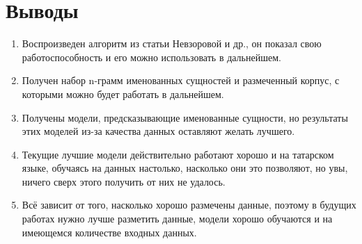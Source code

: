 





\newpage

\section{Выводы}

\begin{enumerate}
\item Воспроизведен алгоритм из статьи Невзоровой и др., он показал свою работоспособность и его можно использовать в дальнейшем. %
\item Получен набор n-грамм именованных сущностей и размеченный корпус, с которыми можно будет работать в дальнейшем.
\item Получены модели, предсказывающие именованные сущности, но результаты этих моделей из-за качества данных оставляют желать лучшего.
\item Текущие лучшие модели действительно работают хорошо и на татарском языке, обучаясь на данных настолько, насколько они это позволяют, но увы, ничего сверх этого получить от них не удалось. 
\item Всё зависит от того, насколько хорошо размечены данные, поэтому в будущих работах нужно лучше разметить данные, модели хорошо обучаются и на имеющемся количестве входных данных.
\end{enumerate}
























